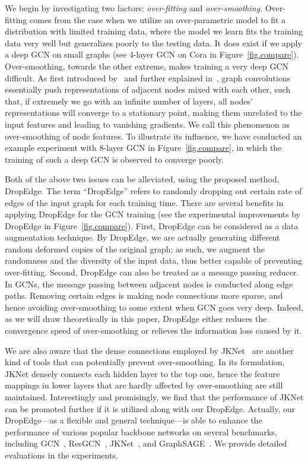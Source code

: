 \documentclass{article}
\begin{document}
We begin by investigating two factors: \emph{over-fitting} and \emph{over-smoothing}. Over-fitting comes from the case when we utilize an over-parametric model to fit a distribution with limited training data, where the model we learn fits the training data very well but generalizes poorly to the testing data. It does exist if we apply a deep GCN on small graphs (see 4-layer GCN on Cora in Figure~\ref{fig.compare}).
Over-smoothing, towards the other extreme, makes training a very deep GCN difficult.
As first introduced by~\citet{Li2018} and further explained in~\citet{Wu2019,Xu2018,Klicpera2019}, graph convolutions essentially push representations of adjacent nodes mixed with each other, such that, if extremely we go with an infinite number of layers, all nodes' representations will converge to a stationary point, making them unrelated to the input features and leading to vanishing gradients. We call this phenomenon as over-smoothing of node features.
To illustrate its influence, we have conducted an example experiment with 8-layer GCN in Figure~\ref{fig.compare}, in which the training of such a deep GCN is observed to converge poorly.

Both of the above two issues can be alleviated, using the proposed method, DropEdge. The term ``DropEdge'' refers to randomly dropping out certain rate of edges of the input graph for each training time.
There are several benefits in applying DropEdge for the GCN training (see the experimental improvements by DropEdge in Figure~\ref{fig.compare}). First, DropEdge can be considered as a data augmentation technique. By DropEdge, we are actually generating different random deformed copies of the original graph; as such, we augment the randomness and the diversity of the input data, thus better capable of preventing over-fitting.
Second, DropEdge can also be treated as a message passing reducer. In GCNs, the message passing between adjacent nodes is conducted along edge paths. Removing certain edges is making node connections more sparse, and hence avoiding over-smoothing to some extent when GCN goes very deep. Indeed, as we will draw theoretically in this paper, DropEdge either reduces the convergence speed of over-smoothing or relieves the information loss caused by it.




We are also aware that the dense connections employed by JKNet~\citep{Xu2018} are another kind of tools that can potentially prevent over-smoothing. In its formulation, JKNet densely connects each hidden layer to the top one, hence the feature mappings in lower layers that are hardly affected by over-smoothing are still maintained. Interestingly and promisingly, we find that the performance of JKNet can be promoted further if it is utilized along with our DropEdge.  Actually, our DropEdge---as a flexible and general technique---is able to enhance the performance of various popular backbone networks on several benchmarks, including GCN~\citep{Kipf2017}, ResGCN~\citep{li2019can}, JKNet~\citep{Xu2018}, and GraphSAGE~\citep{hamilton2017inductive}. We provide detailed evaluations in the experiments.
\end{document}
